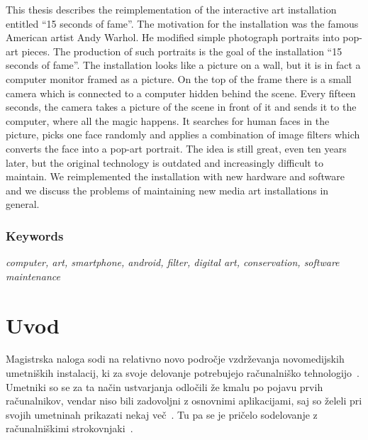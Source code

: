 \documentclass[a4paper, 12pt]{book}
\begin{document}
This thesis describes the reimplementation of the interactive art installation
entitled ``15 seconds of fame''. The motivation for the installation was the
famous American artist Andy Warhol. He modified simple photograph portraits
into pop-art pieces. The production of such portraits is the goal of the
installation ``15 seconds of fame''. The installation looks like a picture on
a wall, but it is in fact a computer monitor framed as a picture. On the top
of the frame there is a small camera which is connected to a computer hidden
behind the scene. Every fifteen seconds, the camera takes a picture of the
scene in front of it and sends it to the computer, where all the magic happens. It
searches for human faces in the picture, picks one face randomly and applies a
combination of image filters which converts the face into a pop-art
portrait. The idea is still great, even ten years later, but the original
technology is outdated and increasingly difficult to maintain. We reimplemented
the installation with new hardware and software and we discuss the problems of
maintaining new media art installations in general.

\subsection*{Keywords}
\textit{computer, art, smartphone, android, filter, digital art, conservation, software maintenance}
\clearemptydoublepage



\mainmatter 
\pagestyle{mainmatter}



\chapter{Uvod}
\newcommand{\refPoglavju}[1]{\ref{#1}.~poglavju}

Magistrska naloga sodi na relativno novo področje vzdrževanja novomedijskih
umetniških instalacij, ki za svoje delovanje potrebujejo računalniško
tehnologijo~\cite{firstdecade}. Umetniki so se za ta način ustvarjanja
odločili že kmalu po pojavu prvih računalnikov, vendar niso bili zadovoljni z
osnovnimi aplikacijami, saj so želeli pri svojih umetninah prikazati nekaj
več~\cite{miller2}. Tu pa se je pričelo sodelovanje z računalniškimi
strokovnjaki~\cite{miller1}.
\end{document}
